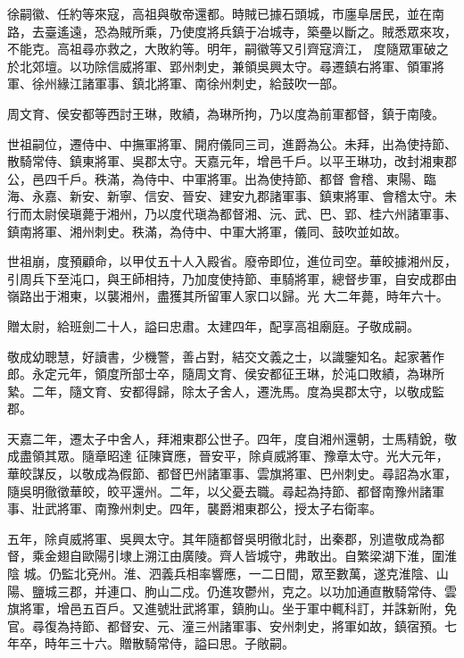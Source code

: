 \begin{pinyinscope}
 徐嗣徽、任約等來寇，高祖與敬帝還都。時賊已據石頭城，市廛阜居民，並在南路，去臺遙遠，恐為賊所乘，乃使度將兵鎮于冶城寺，築壘以斷之。賊悉眾來攻，不能克。高祖尋亦救之，大敗約等。明年，嗣徽等又引齊寇濟江，
 度隨眾軍破之於北郊壇。以功除信威將軍、郢州刺史，兼領吳興太守。尋遷鎮右將軍、領軍將軍、徐州緣江諸軍事、鎮北將軍、南徐州刺史，給鼓吹一部。



 周文育、侯安都等西討王琳，敗績，為琳所拘，乃以度為前軍都督，鎮于南陵。



 世祖嗣位，遷侍中、中撫軍將軍、開府儀同三司，進爵為公。未拜，出為使持節、散騎常侍、鎮東將軍、吳郡太守。天嘉元年，增邑千戶。以平王琳功，改封湘東郡公，邑四千戶。秩滿，為侍中、中軍將軍。出為使持節、都督
 會稽、東陽、臨海、永嘉、新安、新寧、信安、晉安、建安九郡諸軍事、鎮東將軍、會稽太守。未行而太尉侯瑱薨于湘州，乃以度代瑱為都督湘、沅、武、巴、郢、桂六州諸軍事、鎮南將軍、湘州刺史。秩滿，為侍中、中軍大將軍，儀同、鼓吹並如故。



 世祖崩，度預顧命，以甲仗五十人入殿省。廢帝即位，進位司空。華皎據湘州反，引周兵下至沌口，與王師相持，乃加度使持節、車騎將軍，總督步軍，自安成郡由嶺路出于湘東，以襲湘州，盡獲其所留軍人家口以歸。光
 大二年薨，時年六十。



 贈太尉，給班劍二十人，謚曰忠肅。太建四年，配享高祖廟庭。子敬成嗣。



 敬成幼聰慧，好讀書，少機警，善占對，結交文義之士，以識鑒知名。起家著作郎。永定元年，領度所部士卒，隨周文育、侯安都征王琳，於沌口敗績，為琳所縶。二年，隨文育、安都得歸，除太子舍人，遷洗馬。度為吳郡太守，以敬成監郡。



 天嘉二年，遷太子中舍人，拜湘東郡公世子。四年，度自湘州還朝，士馬精銳，敬成盡領其眾。隨章昭達
 征陳寶應，晉安平，除貞威將軍、豫章太守。光大元年，華皎謀反，以敬成為假節、都督巴州諸軍事、雲旗將軍、巴州刺史。尋詔為水軍，隨吳明徹徵華皎，皎平還州。二年，以父憂去職。尋起為持節、都督南豫州諸軍事、壯武將軍、南豫州刺史。四年，襲爵湘東郡公，授太子右衛率。



 五年，除貞威將軍、吳興太守。其年隨都督吳明徹北討，出秦郡，別遣敬成為都督，乘金翅自歐陽引埭上溯江由廣陵。齊人皆城守，弗敢出。自繁梁湖下淮，圍淮陰
 城。仍監北兗州。淮、泗義兵相率響應，一二日間，眾至數萬，遂克淮陰、山陽、鹽城三郡，并連口、朐山二戍。仍進攻鬱州，克之。以功加通直散騎常侍、雲旗將軍，增邑五百戶。又進號壯武將軍，鎮朐山。坐于軍中輒科訂，并誅新附，免官。尋復為持節、都督安、元、潼三州諸軍事、安州刺史，將軍如故，鎮宿預。七年卒，時年三十六。贈散騎常侍，謚曰思。子敞嗣。




\end{pinyinscope}
